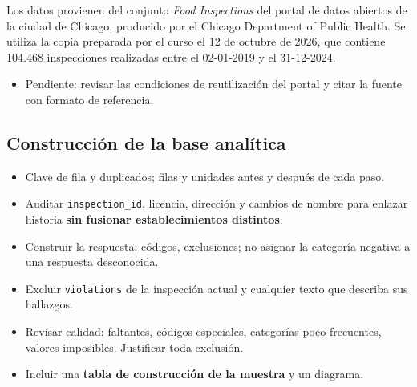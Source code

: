\documentclass[
  spanish,
  letterpaper,
  DIV=11,
  numbers=noendperiod]{scrartcl}
\providecommand{\tightlist}{%
  \setlength{\itemsep}{0pt}\setlength{\parskip}{0pt}}
\begin{document}
Los datos provienen del conjunto \emph{Food Inspections} del portal de
datos abiertos de la ciudad de Chicago, producido por el Chicago
Department of Public Health. Se utiliza la copia preparada por el curso
el 12 de octubre de 2026, que contiene 104.468 inspecciones realizadas
entre el 02-01-2019 y el 31-12-2024.

\begin{tcolorbox}[enhanced jigsaw, toptitle=1mm, bottomrule=.15mm, breakable, opacityback=0, title=\textcolor{quarto-callout-note-color}{\faInfo}\hspace{0.5em}{Notas del equipo}, toprule=.15mm, bottomtitle=1mm, colframe=quarto-callout-note-color-frame, rightrule=.15mm, titlerule=0mm, colback=white, arc=.35mm, left=2mm, opacitybacktitle=0.6, coltitle=black, leftrule=.75mm, colbacktitle=quarto-callout-note-color!10!white]

\begin{itemize}
\tightlist
\item
  Pendiente: revisar las condiciones de reutilización del portal y citar
  la fuente con formato de referencia.
\end{itemize}

\end{tcolorbox}

\subsection{Construcción de la base
analítica}\label{construcciuxf3n-de-la-base-analuxedtica}

\begin{tcolorbox}[enhanced jigsaw, toptitle=1mm, bottomrule=.15mm, breakable, opacityback=0, title=\textcolor{quarto-callout-important-color}{\faExclamation}\hspace{0.5em}{Qué exige (enunciado 2.2 y ficha del caso)}, toprule=.15mm, bottomtitle=1mm, colframe=quarto-callout-important-color-frame, rightrule=.15mm, titlerule=0mm, colback=white, arc=.35mm, left=2mm, opacitybacktitle=0.6, coltitle=black, leftrule=.75mm, colbacktitle=quarto-callout-important-color!10!white]

\begin{itemize}
\tightlist
\item
  Clave de fila y duplicados; filas y unidades antes y después de cada
  paso.
\item
  Auditar \texttt{inspection\_id}, licencia, dirección y cambios de
  nombre para enlazar historia \textbf{sin fusionar establecimientos
  distintos}.
\item
  Construir la respuesta: códigos, exclusiones; no asignar la categoría
  negativa a una respuesta desconocida.
\item
  Excluir \texttt{violations} de la inspección actual y cualquier texto
  que describa sus hallazgos.
\item
  Revisar calidad: faltantes, códigos especiales, categorías poco
  frecuentes, valores imposibles. Justificar toda exclusión.
\item
  Incluir una \textbf{tabla de construcción de la muestra} y un
  diagrama.
\end{itemize}

\end{tcolorbox}
\end{document}
